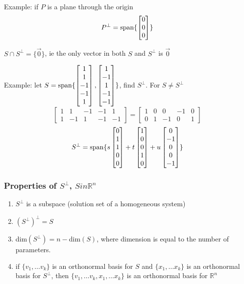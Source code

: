 \documentclass[12pt]{article}
\newcommand{\R}[1]{\mathbb{R}^{#1}}
\newcommand{\spanv}[1]{{\rm span}\{#1\}}
\newcommand{\vecthree}[3]{\begin{bmatrix}#1\\#2\\#3\end{bmatrix}}
\begin{document}
Example: if $P$ is a plane through the origin \[ P^\perp = \spanv{\vecthree{0}{0}{0}} \]

$S\cap S^\perp = \{\vec{0}\}$, ie the only vector in both $S$ and $S^\perp$ is $\vec{0}$

Example: let $S = \spanv{\begin{bmatrix}1\\1\\-1\\-1\\1\end{bmatrix},\begin{bmatrix}1\\-1\\1\\-1\\-1\end{bmatrix}}$, find $S^\perp$. For $S \neq S^\perp$ \[ \begin{bmatrix}1&1&-1&-1&1\\1&-1&1&-1&-1\end{bmatrix} = \begin{bmatrix}1&0&0&-1&0\\0&1&-1&0&1\end{bmatrix} \] \[ S^\perp = \spanv{s\begin{bmatrix}0\\1\\1\\0\\0\end{bmatrix} + t\begin{bmatrix}1\\0\\0\\1\\0\end{bmatrix} + u\begin{bmatrix}0\\-1\\0\\0\\-1\end{bmatrix}} \]

\subsubsection*{Properties of $S^\perp$, $Sin\R{n}$}
\begin{enumerate}
\item $S^\perp$ is a subspace (solution set of a homogeneous system)
\item $(S^\perp)^\perp = S$
\item dim$(S^\perp) = n - $dim$(S)$, where dimension is equal to the number of parameters.
\item if $\{v_1,\dots v_k\}$ is an orthonormal basis for $S$ and $\{x_1,\dots x_k\}$ is an orthonormal basis for $S^\perp$, then $\{v_1,\dots v_k,x_1,\dots x_k\}$ is an orthonormal basis for $\R{n}$
\end{enumerate}
\end{document}
